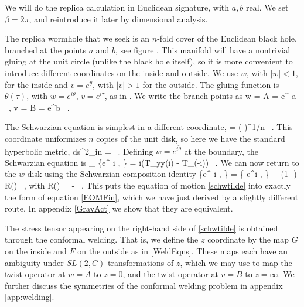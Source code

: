 We will do the replica calculation in Euclidean signature, with $a,b$ real. We set $\beta = 2\pi$, and reintroduce it later by dimensional analysis. 

The replica wormhole that we seek is an $n$-fold cover of the Euclidean black hole, branched at the points $a$ and $b$, 
see figure . 
This manifold will have a nontrivial gluing at the unit circle (unlike the black hole itself), so it is more convenient to introduce different coordinates on the inside and outside. We use $w$, with $|w| < 1$, for the inside and 
$v = e^y$, with $|v|>1$ for the outside.    The gluing function is $\theta(\tau)$, with 
$
w = e^{i \theta} $, $ v = e^{i\tau} $, as in . 
We write the branch points as 
\be
w = A = e^{-a} \ , \qquad v = B = e^b \ .
\ee

The Schwarzian equation is simplest in a different coordinate, 
\be {}
 = \left(  \right)^{1/n} \ .
\ee
This coordinate uniformizes $n$ copies of the unit disk, so here we have the standard hyperbolic metric,
\be {}
ds^2_{in} =  \ .
\ee
Defining   $\tilde w = e^{ i \tilde \theta}$ at the boundary, the Schwarzian equation is
\be\label{schwtilde}
 \p_{\tau} \{e^{ i \tilde \theta}, \tau\} = i(T_{yy}(i\tau) - T_{\by\by}(-i\tau)) \ .
\ee
We can now return to the $w$-disk using the Schwarzian composition identity
\be
\{e^{ i \tilde \theta} , \tau\} = \{ e^{i \theta}, \tau\}  + \left(1-  \right) R(\theta) \ , 
\ee
with
\be {}
R(\theta) = -  \ .
\ee
This puts the equation of motion \eqref{schwtilde} into exactly the form of equation  \eqref{EOMFin}, which we have just derived by a slightly different route. In appendix \ref{GravAct} we show that they are equivalent. 

The stress tensor appearing on the right-hand side of \eqref{schwtilde} is obtained through the conformal welding. That is, we define the $z$ coordinate by the map $G$ on the inside and $F$ on the outside as in \eqref{WeldEqns}. These maps each have an ambiguity under $SL(2,C)$ transformations of $z$, which we may use to map the twist operator at $w = A$ to $z=0$, and the twist operator at $v = B$ to $z = \infty$. We further discuss the symmetries of the conformal welding problem in appendix \ref{app:welding}.

